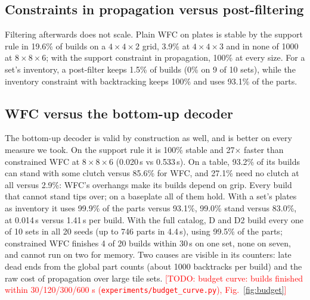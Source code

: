 \documentclass[10pt,twocolumn]{article}
\newcommand{\todo}[1]{\textcolor{red}{[TODO: #1]}}
\begin{document}
\begin{table}[t]
  \centering\small
  \resizebox{\textwidth}{!}{}
  \caption{Each constraint or component switched off.}
  \label{tab:ablation}
\end{table}

\subsection{Constraints in propagation versus post-filtering}
Filtering afterwards does not scale. Plain WFC on plates is stable by the support rule in 19.6\% of builds on a
$4\times4\times2$ grid, 3.9\% at $4\times4\times3$ and in none of 1000 at $8\times8\times6$; with the support
constraint in propagation, 100\% at every size.
For a set's inventory, a post-filter keeps 1.5\% of builds (0\% on 9 of 10 sets), while the inventory constraint
with backtracking keeps 100\% and uses 93.1\% of the parts.

\subsection{WFC versus the bottom-up decoder}
The bottom-up decoder is valid by construction as well, and is better on every measure we took.
On the support rule it is 100\% stable and 27$\times$ faster than constrained WFC at $8\times8\times6$ (0.020\,s vs
0.533\,s).
On a table, 93.2\% of its builds can stand with some clutch versus 85.6\% for WFC, and 27.1\% need no clutch at
all versus 2.9\%: WFC's overhangs make its builds depend on grip. Every build that cannot stand tips over; on a
baseplate all of them hold.
With a set's plates as inventory it uses 99.9\% of the parts versus 93.1\%, 99.0\% stand versus 83.0\%, at
0.014\,s versus 1.41\,s per build.
With the full catalog, D and D2 build every one of 10 sets in all 20 seeds (up to 746 parts in 4.4\,s), using
99.5\% of the parts; constrained WFC finishes 4 of 20 builds within 30\,s on one set, none on seven, and cannot run
on two for memory. Two causes are visible in its counters: late dead ends from the global part counts (about
1000 backtracks per build) and the raw cost of propagation over large tile sets.
\todo{budget curve: builds finished within 30/120/300/600 s (\texttt{experiments/budget\_curve.py}), Fig.~\ref{fig:budget}}
\end{document}
